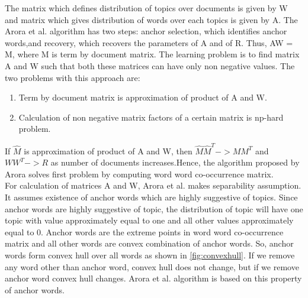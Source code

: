\documentclass[a4paper,11pt]{article}
\begin{document}
The matrix which defines distribution of topics over documents is given by W and matrix which gives distribution of words over each topics is given by A. The Arora et al. \cite{tm} algorithm has two steps: anchor selection, which identifies anchor words,and recovery, which recovers the parameters of A and of R. Thus, AW = M, where M is term by document matrix. The learning problem is to find matrix A and W such that both these matrices can have only non negative values. The two problems with this approach are: \\

\begin{enumerate}
\item Term by document matrix is approximation of product of A and W.
\item Calculation of non negative matrix factors of a certain matrix is np-hard problem.
\end{enumerate}

If $\hat{M}$  is approximation of product of A and W, then $\hat{M} \hat{M}^T -> M M^T $ and $W W^T -> R$ as number of documents increases.Hence, the 	algorithm proposed by Arora solves first problem by computing word word co-occurrence matrix. \\

For calculation of matrices A and W, Arora et al. \cite{tm} makes separability assumption. It assumes existence of anchor words which are highly suggestive of topics. Since anchor words are highly suggestive of topic, the distribution of topic will have one topic with value approximately equal to one and all other values approximately equal to 0. Anchor words are the extreme points in word word co-occurrence matrix and all other words are convex combination of anchor words. So, anchor words form convex hull over all words as shown in \ref{fig:convexhull}. If we remove any word other than anchor word, convex hull does not change, but if we remove anchor word convex hull changes. Arora et al. \cite{tm} algorithm is based on this property of anchor words. \\
\end{document}
